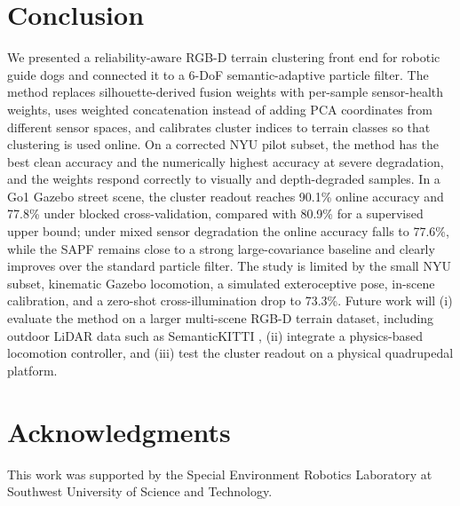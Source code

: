 \documentclass[final,3p,times]{elsarticle}
\begin{document}
\section{Conclusion}
\label{sec:conclusion}
We presented a reliability-aware RGB-D terrain clustering front end for robotic guide dogs and connected it to a 6-DoF semantic-adaptive particle filter. The method replaces silhouette-derived fusion weights with per-sample sensor-health weights, uses weighted concatenation instead of adding PCA coordinates from different sensor spaces, and calibrates cluster indices to terrain classes so that clustering is used online. On a corrected NYU pilot subset, the method has the best clean accuracy and the numerically highest accuracy at severe degradation, and the weights respond correctly to visually and depth-degraded samples. In a Go1 Gazebo street scene, the cluster readout reaches 90.1\% online accuracy and 77.8\% under blocked cross-validation, compared with 80.9\% for a supervised upper bound; under mixed sensor degradation the online accuracy falls to 77.6\%, while the SAPF remains close to a strong large-covariance baseline and clearly improves over the standard particle filter. The study is limited by the small NYU subset, kinematic Gazebo locomotion, a simulated exteroceptive pose, in-scene calibration, and a zero-shot cross-illumination drop to 73.3\%. Future work will (i) evaluate the method on a larger multi-scene RGB-D terrain dataset, including outdoor LiDAR data such as SemanticKITTI \cite{behley2019semantickitti}, (ii) integrate a physics-based locomotion controller, and (iii) test the cluster readout on a physical quadrupedal platform.

\section*{Acknowledgments}
This work was supported by the Special Environment Robotics Laboratory at Southwest University of Science and Technology.



\end{document}
